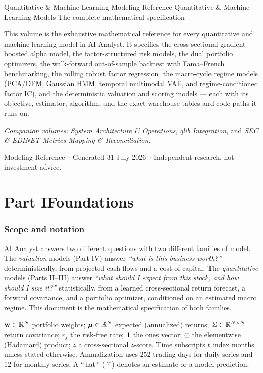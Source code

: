 \documentclass[11pt]{article}
\begin{document}
\mzqatitlepage
  {Quantitative \& Machine-Learning Modeling Reference}
  {Quantitative \& Machine-Learning Models}
  {The complete mathematical specification}
  {This volume is the exhaustive mathematical reference for every quantitative and
   machine-learning model in AI Analyst. It specifies the cross-sectional
   gradient-boosted alpha model, the factor-structured risk models, the dual
   portfolio optimizers, the walk-forward out-of-sample backtest with
   Fama--French benchmarking, the rolling robust factor regression, the
   macro-cycle regime models (PCA/DFM, Gaussian HMM, temporal multimodal VAE, and
   regime-conditioned factor IC), and the deterministic valuation and scoring
   models --- each with its objective, estimator, algorithm, and the exact
   warehouse tables and code paths it runs on.

   \vspace{8pt}
   \textit{Companion volumes:} \emph{System Architecture \& Operations},
   \emph{qlib Integration}, and \emph{SEC \& EDINET Metrics Mapping \&
   Reconciliation}.}
  {Modeling Reference \quad·\quad Generated 31 July 2026 \quad·\quad Independent research, not investment advice.}

\mzqatoc
\clearpage

\part*{Part I\quad Foundations}

\section{Scope and notation}

AI Analyst answers two different questions with two different families of model.
The \emph{valuation} models (Part IV) answer \emph{``what is this business worth?''}
deterministically, from projected cash flows and a cost of capital. The
\emph{quantitative} models (Parts II--III) answer \emph{``what should I expect from
this stock, and how should I size it?''} statistically, from a learned
cross-sectional return forecast, a forward covariance, and a portfolio optimizer,
conditioned on an estimated macro regime. This document is the mathematical
specification of both families.

\begin{specbox}
\; $\mathbf{w}\in\mathbb{R}^N$ portfolio weights; $\boldsymbol{\mu}\in\mathbb{R}^N$ expected
(annualized) returns; $\Sigma\in\mathbb{R}^{N\times N}$ return covariance; $r_f$ the
risk-free rate; $\mathbf{1}$ the ones vector; $\odot$ the elementwise (Hadamard)
product; $z$ a cross-sectional $z$-score. Time subscripts $t$ index months unless
stated otherwise. Annualization uses $252$ trading days for daily series and $12$
for monthly series. A ``\,hat\,'' ($\hat{\,\cdot\,}$) denotes an estimate or a
model prediction.
\end{specbox}
\end{document}
